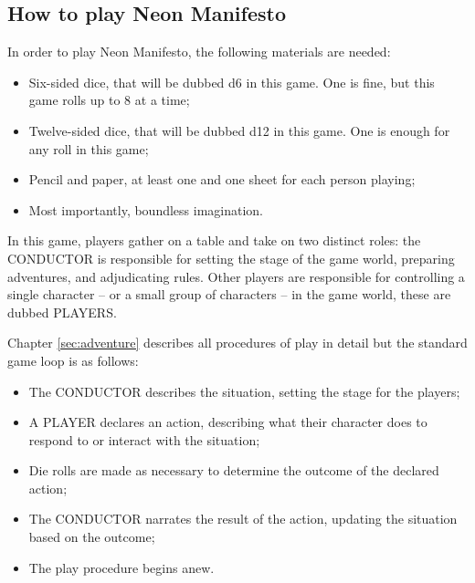 \subsection{How to play Neon Manifesto}
In order to play Neon Manifesto, the following materials are needed:
\begin{itemize}
\item {Six-sided dice, that will be dubbed d6 in this game. One is fine, but this game rolls up to 8 at a time;}
\item {Twelve-sided dice, that will be dubbed d12 in this game. One is enough for any roll in this game;}
\item {Pencil and paper, at least one and one sheet for each person playing;}
\item {Most importantly, boundless imagination.}
\end{itemize}

In this game, players gather on a table and take on two distinct roles: the CONDUCTOR is responsible for setting the stage of the game world, preparing adventures, and adjudicating rules. Other players are responsible for controlling a single character -- or a small group of characters -- in the game world, these are dubbed PLAYERS.

Chapter \ref{sec:adventure} describes all procedures of play in detail but the standard game loop is as follows:
\begin{itemize}
    \item The CONDUCTOR describes the situation, setting the stage for the players;
    \item A PLAYER declares an action, describing what their character does to respond to or interact with the situation;
    \item Die rolls are made as necessary to determine the outcome of the declared action;
    \item The CONDUCTOR narrates the result of the action, updating the situation based on the outcome;
    \item The play procedure begins anew.
\end{itemize}
